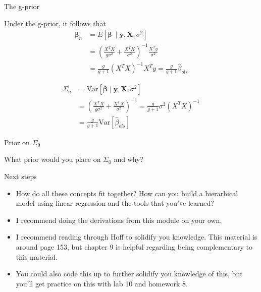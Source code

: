 \documentclass[
  ignorenonframetext,
]{beamer}
\newcommand{\bbeta}{\bm{\beta}}
\newcommand{\bX}   {\bm{X}}
\newcommand{\Var}{\text{Var}}
\begin{document}
\begin{frame}{The g-prior}
\protect\hypertarget{the-g-prior-1}{}

Under the g-prior, it follows that \begin{align}
\bbeta_n &= E[\bbeta\ \mid \bm{y}, \bX, \sigma^2]  \\
&= \left(\frac{X^TX}{g \sigma^2} + \frac{X^TX}{\sigma^2}\right)^{-1} \frac{X^Ty}{\sigma^2} \\
&= \frac{g}{g+1} (X^TX)^{-1} X^Ty
= \frac{g}{g+1} \hat{\beta}_{ols}
\end{align}

\begin{align}
\Sigma_n &= \text{Var}[\bbeta \mid \bm{y}, \bX, \sigma^2] \\
&= \left(\frac{X^TX}{g \sigma^2} + \frac{X^TX}{\sigma^2}\right)^{-1}
=\frac{g}{g+1} \sigma^2 (X^TX)^{-1} \\
&= \frac{g}{g+1} \Var[\hat{\beta}_{ols}]
\end{align}

\end{frame}

\begin{frame}{Prior on \(\Sigma_0\)}
\protect\hypertarget{prior-on-sigma_0}{}

What prior would you place on \(\Sigma_0\) and why?

\end{frame}

\begin{frame}{Next steps}
\protect\hypertarget{next-steps}{}

\begin{itemize}
\item
  How do all these concepts fit together? How can you build a
  hierarhical model using linear regression and the tools that you've
  learned?
\item
  I recommend doing the derivations from this module on your own.
\item
  I recommend reading through Hoff to solidify you knowledge. This
  material is around page 153, but chapter 9 is helpful regarding being
  complementary to this material.
\item
  You could also code this up to further solidify you knowledge of this,
  but you'll get practice on this with lab 10 and homework 8.
\end{itemize}

\end{frame}
\end{document}
